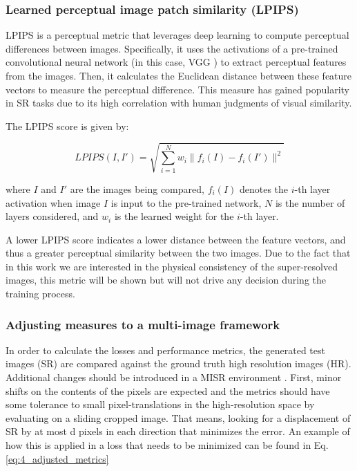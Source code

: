         \subsubsection{Learned perceptual image patch similarity (LPIPS)}

        LPIPS is a perceptual metric that leverages deep learning to compute perceptual differences between images. Specifically, it uses the activations of a pre-trained convolutional neural network (in this case, VGG \cite{VGGnet} ) to extract perceptual features from the images. 
        Then, it calculates the Euclidean distance between these feature vectors to measure the perceptual difference.
        This measure has gained popularity in SR tasks due to its high correlation with human judgments of visual similarity.
        
        The LPIPS score is given by:
        
        \begin{equation}
        LPIPS(I, I') = \sqrt{\sum_{i=1}^{N} w_i\|f_i(I)-f_i(I')\|^2}
        \end{equation}
        
        where $I$ and $I'$ are the images being compared, $f_i(I)$ denotes the $i$-th layer activation when image $I$ is input to the pre-trained network, $N$ is the number of layers considered, and $w_i$ is the learned weight for the $i$-th layer.
        
        A lower LPIPS score indicates a lower distance between the feature vectors, and thus a greater perceptual similarity between the two images. 
        Due to the fact that in this work we are interested in the physical consistency of the super-resolved images, 
        this metric will be shown but will not drive any decision during the training process.
        

        \subsubsection{Adjusting measures to a multi-image framework}
    
            In order to calculate the losses and performance metrics, the generated test images (SR) are compared against the ground truth high resolution images (HR).
            Additional changes should be introduced in a MISR environment \cite{martens2019superresolution}.
            First, minor shifts on the contents of the pixels are expected and the metrics should have some tolerance to small pixel-translations in the high-resolution space by evaluating on a sliding cropped image. 
            That means, looking for a displacement of SR by at most d pixels in each direction that minimizes the error. 
            An example of how this is applied in a loss that needs to be minimized can be found in Eq. \ref{eq:4_adjusted_metrics}
    
